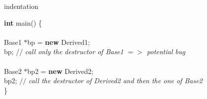 %
%
\expandafter\ifx\csname indentation\endcsname\relax%
\newlength{\indentation}\fi
\setlength{\indentation}{0.5em}
\begin{flushleft}
{\bf int} main() \{\mbox{}\\
\mbox{}\\
\hspace*{2\indentation}Base1 $\ast$bp = {\bf new} Derived1; \mbox{}\\
\hspace*{2\indentation}{\bf delete} bp; {$//$\it{} call only the destructor of Base1 $=$$>$ potential bug {}\mbox{}\\
}\mbox{}\\
\hspace*{2\indentation}Base2 $\ast$bp2 = {\bf new} Derived2; \mbox{}\\
\hspace*{2\indentation}{\bf delete} bp2; {$//$\it{} call the destructor of Derived2 and then the one of Base2{}\mbox{}\\
}\hspace*{1\indentation}\}\mbox{}\\
\end{flushleft}

